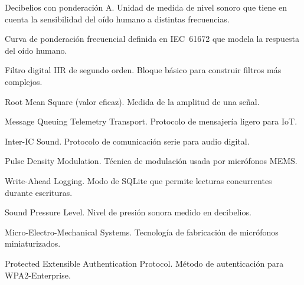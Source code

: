 \documentclass[12pt,a4paper]{report}
\begin{document}
\begin{description}[style=nextline]
    \item[dBA] Decibelios con ponderaci\'on A. Unidad de medida de nivel sonoro que tiene en cuenta la sensibilidad del o\'ido humano a distintas frecuencias.
    \item[A-weighting] Curva de ponderaci\'on frecuencial definida en IEC~61672 que modela la respuesta del o\'ido humano.
    \item[Biquad] Filtro digital IIR de segundo orden. Bloque b\'asico para construir filtros m\'as complejos.
    \item[RMS] Root Mean Square (valor eficaz). Medida de la amplitud de una se\~nal.
    \item[MQTT] Message Queuing Telemetry Transport. Protocolo de mensajer\'ia ligero para IoT.
    \item[I2S] Inter-IC Sound. Protocolo de comunicaci\'on serie para audio digital.
    \item[PDM] Pulse Density Modulation. T\'ecnica de modulaci\'on usada por micr\'ofonos MEMS.
    \item[WAL] Write-Ahead Logging. Modo de SQLite que permite lecturas concurrentes durante escrituras.
    \item[SPL] Sound Pressure Level. Nivel de presi\'on sonora medido en decibelios.
    \item[MEMS] Micro-Electro-Mechanical Systems. Tecnolog\'ia de fabricaci\'on de micr\'ofonos miniaturizados.
    \item[EAP-PEAP] Protected Extensible Authentication Protocol. M\'etodo de autenticaci\'on para WPA2-Enterprise.
\end{description}
\end{document}
